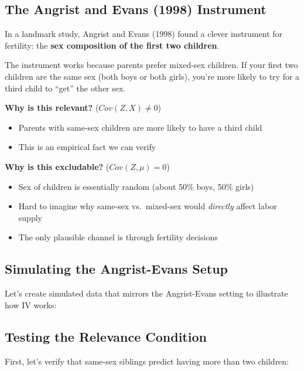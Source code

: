 \documentclass[
  letterpaper,
  DIV=11,
  numbers=noendperiod]{scrreprt}
\providecommand{\tightlist}{%
  \setlength{\itemsep}{0pt}\setlength{\parskip}{0pt}}
\begin{document}
\subsection{The Angrist and Evans (1998)
Instrument}\label{the-angrist-and-evans-1998-instrument}

In a landmark study, Angrist and Evans (1998) found a clever instrument
for fertility: the \textbf{sex composition of the first two children}.

The instrument works because parents prefer mixed-sex children. If your
first two children are the same sex (both boys or both girls), you're
more likely to try for a third child to ``get'' the other sex.

\textbf{Why is this relevant?} (\(Cov(Z, X) \neq 0\))

\begin{itemize}
\tightlist
\item
  Parents with same-sex children are more likely to have a third child
\item
  This is an empirical fact we can verify
\end{itemize}

\textbf{Why is this excludable?} (\(Cov(Z, \mu) = 0\))

\begin{itemize}
\tightlist
\item
  Sex of children is essentially random (about 50\% boys, 50\% girls)
\item
  Hard to imagine why same-sex vs.~mixed-sex would \emph{directly}
  affect labor supply
\item
  The only plausible channel is through fertility decisions
\end{itemize}

\subsection{Simulating the Angrist-Evans
Setup}\label{simulating-the-angrist-evans-setup}

Let's create simulated data that mirrors the Angrist-Evans setting to
illustrate how IV works:

\subsection{Testing the Relevance
Condition}\label{testing-the-relevance-condition}

First, let's verify that same-sex siblings predict having more than two
children:
\end{document}

